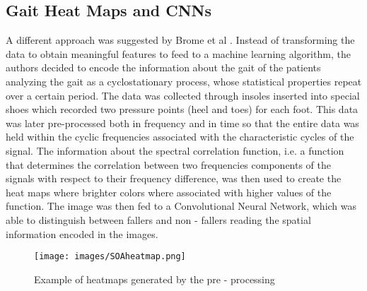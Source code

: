 \subsection{Gait Heat Maps and CNNs}
A different approach was suggested by Brome et al \cite{CycloStationary}. Instead of transforming the data to obtain meaningful features to feed to a machine learning algorithm, the authors decided to encode the information about the gait of the patients analyzing the gait as a cyclostationary process, whose statistical properties repeat over a certain period.
The data was collected through insoles inserted into special shoes which recorded two pressure points (heel and toes) for each foot. This data was later pre-processed both in frequency and in time so that the entire data was held within the cyclic frequencies associated with the characteristic cycles of the signal. 
The information about the spectral correlation function, i.e. a function that determines the correlation between two frequencies components of the signals with respect to their frequency difference, was then used to create the heat maps where brighter colors where associated with higher values of the function. The image was then fed to a Convolutional Neural Network, which was able to distinguish between fallers and non - fallers reading the spatial information encoded in the images.

\begin{figure}[h!]
    \centering
    \texttt{[image: images/SOAheatmap.png]}
    \caption{Example of heatmaps generated by the pre - processing}
    \label{fig:SOAheatmap}
\end{figure}


